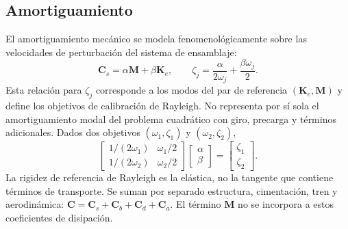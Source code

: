 \documentclass[oneside,a4paper,spanish,links,pagenumbers]{amca}
\begin{document}
\subsection{Amortiguamiento}
El amortiguamiento mecánico se modela fenomenológicamente sobre las velocidades de perturbación del sistema de ensamblaje:
\begin{equation}
\bm C_s=\alpha\bm M+\beta\bm K_e,
\qquad \zeta_j=\frac{\alpha}{2\omega_j}+\frac{\beta\omega_j}{2}.
\end{equation}
Esta relación para $\zeta_j$ corresponde a los modos del par de referencia $(\bm K_e,\bm M)$ y define los objetivos de calibración de Rayleigh. No representa por sí sola el amortiguamiento modal del problema cuadrático con giro, precarga y términos adicionales.
Dados dos objetivos $(\omega_1,\zeta_1)$ y $(\omega_2,\zeta_2)$,
\begin{equation}
\begin{bmatrix}1/(2\omega_1)&\omega_1/2\\1/(2\omega_2)&\omega_2/2\end{bmatrix}
\begin{bmatrix}\alpha\\\beta\end{bmatrix}
=\begin{bmatrix}\zeta_1\\\zeta_2\end{bmatrix}.
\end{equation}
La rigidez de referencia de Rayleigh es la elástica, no la tangente que contiene términos de transporte. Se suman por separado estructura, cimentación, tren y aerodinámica: $\bm C=\bm C_s+\bm C_b+\bm C_d+\bm C_a$. El término $\dot{\bm M}$ no se incorpora a estos coeficientes de disipación.
\end{document}
